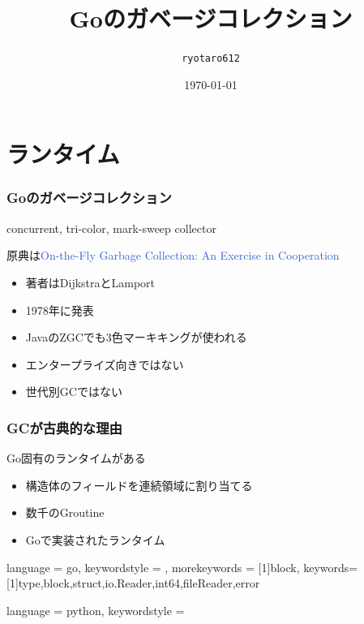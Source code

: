 \documentclass[unicode, 14pt, aspectratio=169]{beamer}
\date{\today}
\title{Goのガベージコレクション}
\author{\texttt{ryotaro612}}
\begin{document}
\begin{frame}
\titlepage
\end{frame}
\section{ランタイム}
\begin{frame}
  \frametitle{Goのガベージコレクション}
  {\large concurrent, tri-color, mark-sweep collector\supercite{go15gc}}
  \par
  原典は\textcolor{highlight}{{\small On-the-Fly Garbage Collection: An Exercise in Cooperation\supercite{on-the-fly}}}
  \begin{itemize}
  \item 著者はDijkstraとLamport
  \item 1978年に発表
  \item JavaのZGCでも3色マーキキングが使われる\supercite{zgc}
  \item エンタープライズ向きではない
  \item 世代別GCではない
  \end{itemize}
\end{frame}
\begin{frame}
  \frametitle{GCが古典的な理由}
  {\large Go固有のランタイムがある\supercite{go-gc}}
  \begin{itemize}
  \item 構造体のフィールドを連続領域に割り当てる
  \item 数千のGroutine
  \item Goで実装されたランタイム
  \end{itemize}
\end{frame}

{
  language = go,
  keywordstyle = {\bfseries\color{highlight}},
  morekeywords = [1]{block},
  keywords=[1]{type,block,struct,io.Reader,int64,fileReader,error}
}

{
  language = python,
  keywordstyle = {\bfseries\color{highlight}}
}
\end{document}
